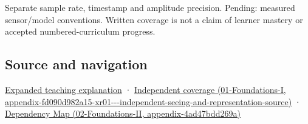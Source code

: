 Separate sample rate, timestamp and amplitude precision. Pending: measured sensor/model conventions. Written coverage is not a claim of learner mastery or accepted numbered-curriculum progress.

\subsection{Source and navigation}\label{appendix-1077ea8fc737-source-and-navigation}

\hyperref[04-visual-computing-ii-ch042-sampling-is-a-question-of-what-remains-distinguishable]{Expanded teaching explanation} · \href{../01-Foundations-I/main.pdf\#nameddest=appendix-fd090d982a15-xr01---independent-seeing-and-representation-source}{Independent coverage (01-Foundations-I, appendix-fd090d982a15-xr01-\/-\/-independent-seeing-and-representation-source)} · \href{../02-Foundations-II/main.pdf\#nameddest=appendix-4ad47bdd269a}{Dependency Map (02-Foundations-II, appendix-4ad47bdd269a)}
